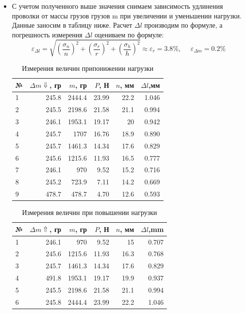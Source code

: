 \documentclass[a4paper,12pt]{article} %
\begin{document}
\begin{itemize}
 \item С учетом полученного выше значения снимаем зависимость удлинения проволки от массы грузов 
грузов m при увеличении и уменьшении нагрузки. Данные заносим в таблицу ниже.
Расчет $\Delta l$ производим по формуле, а погрешность измерения $\Delta l$ оцениваем по формуле:
$$\varepsilon _{\Delta l} = \sqrt{\left( \dfrac{\sigma_{n}}{n}\right)^2 +
  \left(\dfrac{\sigma_r}{r}\right)^2+\left(\dfrac{\sigma_h}{h}\right)^2} \approx  \varepsilon_{r} = 3.8\%, \ \ \ 
\ \ \ \varepsilon_{\Delta m}=0.2\%$$
\begin{table}[!h]
    \begin{center}
    \label{table1}
    \begin{tabular}{|l|r|r|r|r|r|}\hline
        №  & $\Delta m \Downarrow $, гр & $m$, гр & $P$, Н & $n$, мм& $\Delta l$,мм\\ \hline
         1 &  245.8 &  2444.4 &  23.99 &  22.2 &  1.046\\ \hline 
         2 &  245.5 &  2198.6 &  21.58 &  21.1 &  0.994\\ \hline
         3 &  246.1 &  1953.1 &  19.17 &  20   &  0.942\\ \hline
         4 &  245.7 &  1707   &  16.76 &  18.9 &  0.890\\ \hline
         5 &  245.7 &  1461.3 &  14.34 &  17.6 &  0.829\\ \hline
         6 &  245.6 &  1215.6 &  11.93 &  16.5 &  0.777\\ \hline
         7 &  246.1 &  970    &  9.52  &  15.2 &  0.716\\ \hline
         8 &  245.2 &  723.9  &  7.11  &  14.2 &  0.669\\ \hline
         9 &  478.7 &  478.7  &  4.70  &  12.6 &  0.593\\ \hline
        \end{tabular}
    \caption{Измерения величин припонижении нагрузки}
    \end{center}
\end{table}


\begin{table}[!h]
    \begin{center}
    \begin{tabular}{|l|r|r|r|r|r|} \hline
           №  & $\Delta m \Uparrow $, гр & $m$, гр & $P$, Н & $n$, мм & $\Delta l$,mm \\ \hline
         1 &  246.1 &  970 &  9.52 &  15   &  0.707\\ \hline
         2 &  245.6 &  1215.6 &  11.93 &  16.3 &  0.768\\ \hline
         3 &  245.7 &  1461.3   &  14.34 &  17.6 &  0.829\\ \hline
         4 &  491.8 &  1953.1 &  19.17 &  19.9 &  0.937\\ \hline
         5 &  245.5 &  2198.6 &  21.58 &  21.1 &  0.994\\ \hline
         6 &  245.8 &  2444.4 &  23.99 &  22.2 &  1.046\\ \hline
        \end{tabular}
    \caption{Измерения величин при повышении нагрузки}
    \label{table1}
    \end{center}
\end{table}


\end{itemize}
\end{document}
